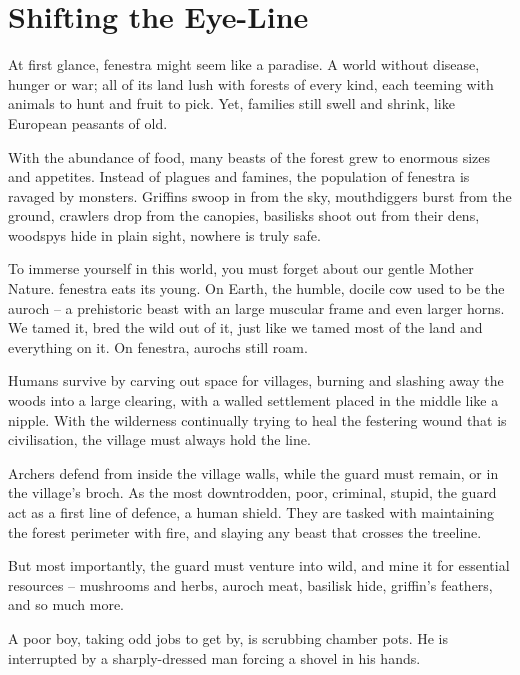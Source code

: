 \section{Shifting the Eye-Line}

\begin{multicols}{2}

\noindent
At first glance, \gls{fenestra} might seem like a paradise.
A world without disease, hunger or war; all of its land lush with forests of every kind, each teeming with animals to hunt and fruit to pick.
Yet, families still swell and shrink, like European peasants of old.

With the abundance of food, many beasts of the forest grew to enormous sizes and appetites.
Instead of plagues and famines, the population of \gls{fenestra} is ravaged by \glspl{monster}.
Griffins swoop in from the sky, mouthdiggers burst from the ground, \glspl{crawler} drop from the canopies, \glspl{basilisk} shoot out from their dens, \glspl{woodspy} hide in plain sight, nowhere is truly safe.

To immerse yourself in this world, you must forget about our gentle Mother Nature.
\Gls{fenestra} eats its young.
On Earth, the humble, docile cow used to be the auroch -- a prehistoric beast with an large muscular frame and even larger horns.
We tamed it, bred the wild out of it, just like we tamed most of the land and everything on it.
On \gls{fenestra}, aurochs still roam.

Humans survive by carving out space for \glspl{village}, burning and slashing away the woods into a large clearing, with a walled settlement placed in the middle like a nipple.
With the wilderness continually trying to heal the festering wound that is civilisation, the \gls{village} must always hold the line.

Archers defend from inside the \gls{village} walls, while the \gls{guard} must remain, or in the \gls{village}'s \gls{broch}.
As the most downtrodden, poor, criminal, stupid, the \gls{guard} act as a first line of defence, a human shield.
They are tasked with maintaining the forest perimeter with fire, and slaying any beast that crosses the treeline.

But most importantly, the \gls{guard} must venture into wild, and mine it for essential resources -- mushrooms and herbs, auroch meat, \gls{basilisk} hide, griffin's feathers, and so much more.

\begin{exampletext}
  A poor boy, taking odd jobs to get by, is scrubbing chamber pots.
  He is interrupted by a sharply-dressed man forcing a shovel in his hands.


\end{exampletext}
\end{multicols}
